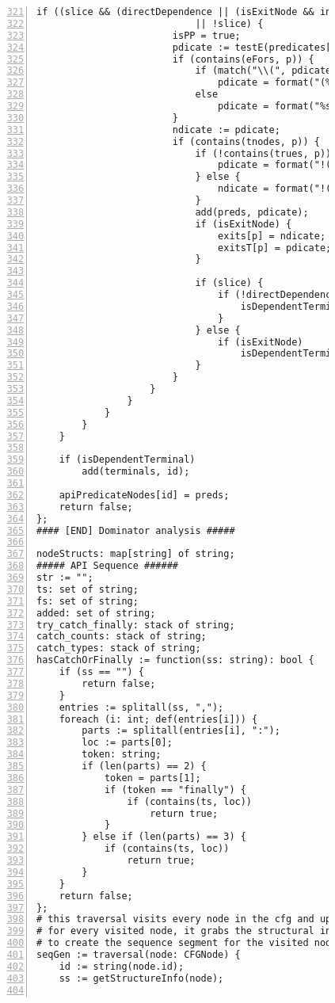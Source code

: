 \begin{figure}[ht!]
\begin{lstlisting}[numbers=left, tabsize=4, escapechar=@, caption={API Usage Mining Analysis},label={lst:aun-code},  firstline = 321, firstnumber = 321, lastline = 381]
                    if ((slice && (directDependence || (isExitNode && indirectDependence))) 
                            || !slice) {
                        isPP = true;
                        pdicate := testE(predicates[p]);
                        if (contains(eFors, p)) {
                            if (match("\\(", pdicate)) 
                                pdicate = format("(%s).size() > 0", pdicate);
                            else
                                pdicate = format("%s.size() > 0", pdicate);
                        }
                        ndicate := pdicate;
                        if (contains(tnodes, p)) {
                            if (!contains(trues, p)) {
                                pdicate = format("!(%s)", pdicate);
                            } else {
                                ndicate = format("!(%s)", ndicate);    
                            }
                            add(preds, pdicate);    
                            if (isExitNode) {
                                exits[p] = ndicate;
                                exitsT[p] = pdicate;
                            }

                            if (slice) {
                                if (!directDependence) {
                                    isDependentTerminal = true;
                                }
                            } else {
                                if (isExitNode)
                                    isDependentTerminal = true;	
                            }
                        }
                    } 
                } 
            }
        }
    } 

    if (isDependentTerminal)
        add(terminals, id);
    
    apiPredicateNodes[id] = preds;
    return false;
};
#### [END] Dominator analysis #####

nodeStructs: map[string] of string;
##### API Sequence ######
str := "";
ts: set of string;
fs: set of string;
added: set of string;
try_catch_finally: stack of string;
catch_counts: stack of string;
catch_types: stack of string;
hasCatchOrFinally := function(ss: string): bool {
    if (ss == "") {
        return false;    
    }
    entries := splitall(ss, ",");
    foreach (i: int; def(entries[i])) {
        parts := splitall(entries[i], ":");
        loc := parts[0];
        token: string;
        if (len(parts) == 2) {
            token = parts[1];
            if (token == "finally") {
                if (contains(ts, loc))
                    return true;
            }
        } else if (len(parts) == 3) {
            if (contains(ts, loc))
                return true;
        }
    }
    return false;
};
# this traversal visits every node in the cfg and updates the sequence
# for every visited node, it grabs the structural information, api calls, and preconditions
# to create the sequence segment for the visited node.
seqGen := traversal(node: CFGNode) {
	id := string(node.id);
	ss := getStructureInfo(node);
	

\end{lstlisting}
\end{figure}
